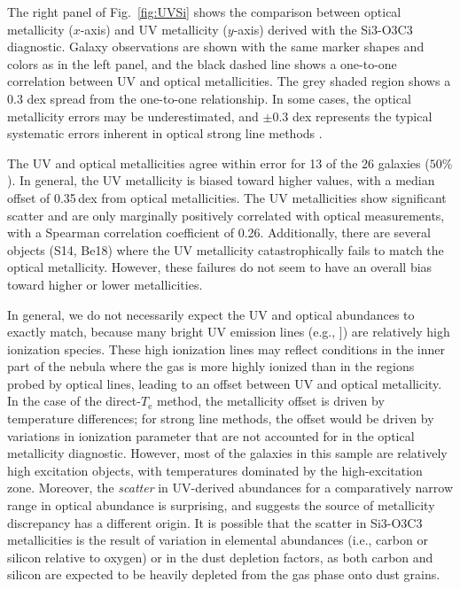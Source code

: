 \documentclass[preprint2]{aastex62}
\newcommand{\ciii}{\ion{C}{3}]}
\newcommand{\Te}{\ensuremath{T_{\mathrm{e}}}\xspace}
\begin{document}
The right panel of Fig.~\ref{fig:UVSi} shows the comparison between optical metallicity ($x$-axis) and UV metallicity ($y$-axis) derived with the Si3-O3C3 diagnostic. Galaxy observations are shown with the same marker shapes and colors as in the left panel, and the black dashed line shows a one-to-one correlation between UV and optical metallicities. The grey shaded region shows a $0.3$ dex spread from the one-to-one relationship. In some cases, the optical metallicity errors may be underestimated, and $\pm 0.3$ dex represents the typical systematic errors inherent in optical strong line methods \citep{Kewley+2019ARAA}.


The UV and optical metallicities agree within error for 13 of the 26 galaxies ($50\%$). In general, the UV metallicity is biased toward higher values, with a median offset of 0.35\,dex from optical metallicities. The UV metallicities show significant scatter and are only marginally positively correlated with optical measurements, with a Spearman correlation coefficient of 0.26. Additionally, there are several objects (S14, Be18) where the UV metallicity catastrophically fails to match the optical metallicity. However, these failures do not seem to have an overall bias toward higher or lower metallicities.

In general, we do not necessarily expect the UV and optical abundances to exactly match, because many bright UV emission lines (e.g., \ciii) are relatively high ionization species. These high ionization lines may reflect conditions in the inner part of the nebula where the gas is more highly ionized than in the regions probed by optical lines, leading to an offset between UV and optical metallicity. In the case of the direct-\Te{} method, the metallicity offset is driven by temperature differences; for strong line methods, the offset would be driven by variations in ionization parameter that are not accounted for in the optical metallicity diagnostic. However, most of the galaxies in this sample are relatively high excitation objects, with temperatures dominated by the high-excitation zone. Moreover, the \emph{scatter} in UV-derived abundances for a comparatively narrow range in optical abundance is surprising, and suggests the source of metallicity discrepancy has a different origin. It is possible that the scatter in Si3-O3C3 metallicities is the result of variation in elemental abundances (i.e., carbon or silicon relative to oxygen) or in the dust depletion factors, as both carbon and silicon are expected to be heavily depleted from the gas phase onto dust grains.
\end{document}
